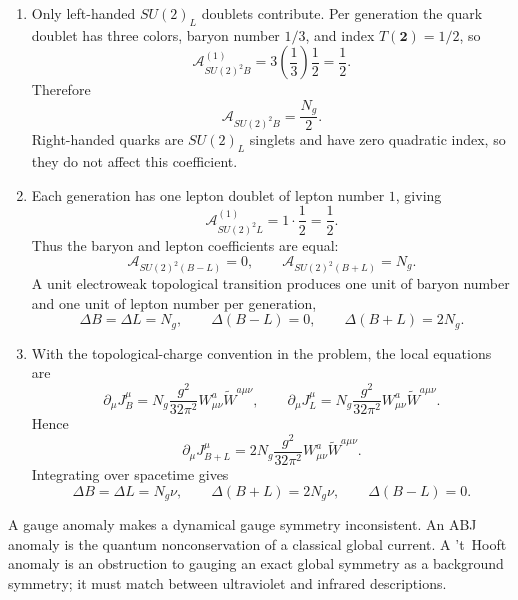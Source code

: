 \begin{enumerate}
  \begin{enumerate}
    \item[(a)]
    Only left-handed \(SU(2)_L\) doublets contribute.  Per generation the
    quark doublet has three colors, baryon number \(1/3\), and index
    \(T(\mathbf2)=1/2\), so
    \[
      \mathcal A_{SU(2)^2B}^{(1)}
        =3\left(\frac13\right)\frac12=\frac12.
    \]
    Therefore
    \[
      \boxed{\mathcal A_{SU(2)^2B}=\frac{N_g}{2}.}
    \]
    Right-handed quarks are \(SU(2)_L\) singlets and have zero quadratic
    index, so they do not affect this coefficient.
    \item[(b)]
    Each generation has one lepton doublet of lepton number \(1\), giving
    \[
      \mathcal A_{SU(2)^2L}^{(1)}=1\cdot\frac12=\frac12.
    \]
    Thus the baryon and lepton coefficients are equal:
    \[
      \mathcal A_{SU(2)^2(B-L)}=0,\qquad
      \mathcal A_{SU(2)^2(B+L)}=N_g.
    \]
    A unit electroweak topological transition produces one unit of baryon
    number and one unit of lepton number per generation,
    \[
      \boxed{\Delta B=\Delta L=N_g,\qquad
        \Delta(B-L)=0,\qquad
        \Delta(B+L)=2N_g.}
    \]
    \item[(c)]
    With the topological-charge convention in the problem, the local
    equations are
    \[
      \partial_\mu J_B^\mu
        =N_g\frac{g^2}{32\pi^2}
          W^a_{\mu\nu}\widetilde W^{a\mu\nu},
      \qquad
      \partial_\mu J_L^\mu
        =N_g\frac{g^2}{32\pi^2}
          W^a_{\mu\nu}\widetilde W^{a\mu\nu}.
    \]
    Hence
    \[
      \partial_\mu J_{B+L}^\mu
        =2N_g\frac{g^2}{32\pi^2}
          W^a_{\mu\nu}\widetilde W^{a\mu\nu}.
    \]
    Integrating over spacetime gives
    \[
      \boxed{\Delta B=\Delta L=N_g\nu,\qquad
        \Delta(B+L)=2N_g\nu,\qquad
        \Delta(B-L)=0.}
    \]
  \end{enumerate}

  A gauge anomaly makes a dynamical gauge symmetry inconsistent.  An ABJ
  anomaly is the quantum nonconservation of a classical global current.
  A 't~Hooft anomaly is an obstruction to gauging an exact global symmetry
  as a background symmetry; it must match between ultraviolet and
  infrared descriptions.


\end{enumerate}
